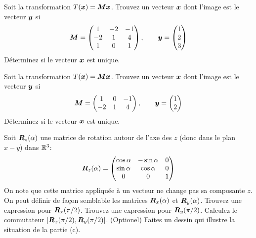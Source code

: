 \begin{TwoCol}
\begin{exercice}
Soit la transformation $T(\boldsymbol{x}) = \boldsymbol{M}\boldsymbol{x}$. Trouvez un vecteur $\boldsymbol{x}$ dont l'image est
le vecteur $\boldsymbol{y}$ si 
\[
\boldsymbol{M} = \begin{pmatrix}
1 & -2 & -1 \\
-2 & 1 & 4 \\
1 & 0 & 1
\end{pmatrix},
\qquad
\boldsymbol{y} = \begin{pmatrix}
1 \\ 2 \\ 3 
\end{pmatrix}
\]
Déterminez si le vecteur $\boldsymbol{x}$ est unique.
\end{exercice}
\begin{exercice}
Soit la transformation $T(\boldsymbol{x}) = \boldsymbol{M}\boldsymbol{x}$. Trouvez un vecteur $\boldsymbol{x}$ dont l'image est
le vecteur $\boldsymbol{y}$ si 
\[
\boldsymbol{M} = \begin{pmatrix}
1 & 0 & -1 \\
-2 & 1 & 4
\end{pmatrix},
\qquad
\boldsymbol{y} = \begin{pmatrix}
1 \\ 2 
\end{pmatrix}
\]
Déterminez si le vecteur $\boldsymbol{x}$ est unique.
\end{exercice}

\begin{exercice}
Soit $\boldsymbol{R}_z(\alpha)$ une matrice de rotation autour de l'axe des $z$ (donc dans le plan $x-y$) dans $\mathbb{R}^3$:
\[
\boldsymbol{R}_z(\alpha) = \begin{pmatrix}
\cos\alpha & -\sin\alpha & 0\\
\sin\alpha & \cos\alpha & 0 \\
0 & 0 & 1
\end{pmatrix}
\]
On note que cette matrice appliquée à un vecteur ne change pas sa composante $z$.
On peut définir de façon semblable les matrices
$\boldsymbol{R}_x(\alpha)$ et $\boldsymbol{R}_y(\alpha)$.  
 Trouvez une expression pour $\boldsymbol{R}_x(\pi/2)$.
 Trouvez une expression pour $\boldsymbol{R}_y(\pi/2)$.
 Calculez le commutateur $[\boldsymbol{R}_x(\pi/2), \boldsymbol{R}_y(\pi/2)]$.
 (Optionel) Faites un dessin qui illustre la situation de la partie (c).
\end{exercice}


\end{TwoCol}